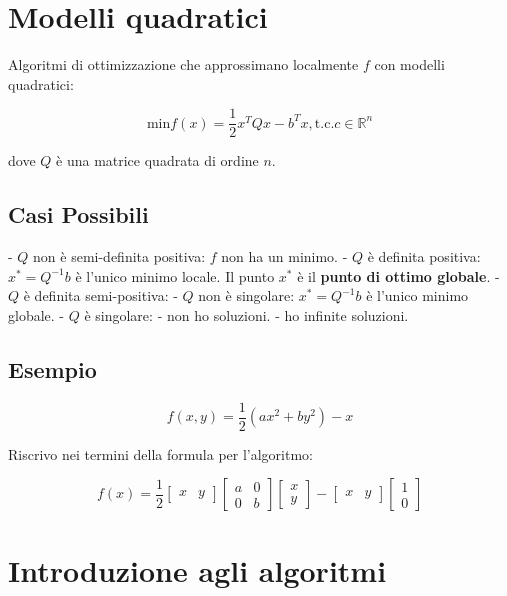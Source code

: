\documentclass[\main/main.tex]{subfiles}
\begin{document}
\section{Modelli quadratici}

Algoritmi di ottimizzazione che approssimano localmente $f$ con modelli quadratici:

\[
  \text{min} f(x) = \dfrac{1}{2}x^T Qx - b^Tx, \text{t.c.} c \in \mathbb{R}^n
\]

dove $Q$ è una matrice quadrata di ordine $n$.

\subsection{Casi Possibili}

- $Q$ non è semi-definita positiva: $f$ non ha un minimo.
- $Q$ è definita positiva: $x^* = Q^{-1}b$ è l'unico minimo locale. Il punto $x^*$ è il \textbf{punto di ottimo globale}.
- $Q$ è definita semi-positiva:
- $Q$ non è singolare: $x^* = Q^{-1} b$ è l'unico minimo globale.
- $Q$ è singolare:
- non ho soluzioni.
- ho infinite soluzioni.


\subsection{Esempio}

\[
  f(x,y) = \dfrac{1}{2} (ax^2 + by^2) - x
\]

Riscrivo nei termini della formula per l'algoritmo:

\[
  f(x) = \dfrac{1}{2}
  \begin{bmatrix}
    x & y
  \end{bmatrix}
  \begin{bmatrix}
    a & 0 \\
    0 & b
  \end{bmatrix}
  \begin{bmatrix}
    x \\
    y
  \end{bmatrix}
  -
  \begin{bmatrix}
    x & y
  \end{bmatrix}
  \begin{bmatrix}
    1 \\
    0
  \end{bmatrix}
\]


\section{Introduzione agli algoritmi}
\end{document}
